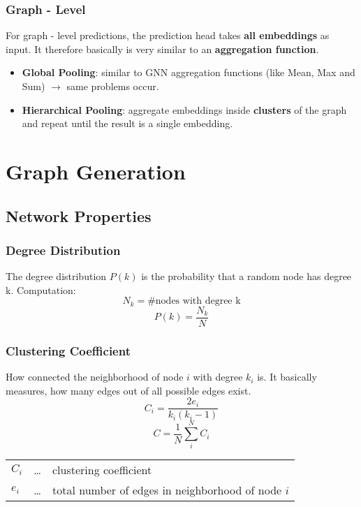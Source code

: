 \documentclass[parskip=full]{scrartcl}
\begin{document}
\subsubsection{Graph - Level}
For graph - level predictions, the prediction head takes \textbf{all embeddings} as input. It therefore basically is very similar to an \textbf{aggregation function}. \newline
\begin{itemize}
	\item \textbf{Global Pooling}: similar to GNN aggregation functions (like Mean, Max and Sum) $\rightarrow$ same problems occur.
	\item \textbf{Hierarchical Pooling}: aggregate embeddings inside \textbf{clusters} of the graph and repeat until the result is a single embedding.
\end{itemize}

\section{Graph Generation}

\subsection{Network Properties}

\subsubsection{Degree Distribution}
The degree distribution \textbf{$P(k)$} is the probability that a random node has degree k.\newline
Computation:
\[N_k = \text{\#nodes with degree k}\]
\[P(k) = \frac{N_k}{N}\]

\subsubsection{Clustering Coefficient}
How connected the neighborhood of node $i$ with degree $k_i$ is. It basically measures, how many edges out of all possible edges exist.
\[C_i = \frac{2e_i}{k_i\left(k_i-1\right)}\]
\[C = \frac{1}{N} \sum_{i}^{N} C_i\]
\begin{center}
\begin{tabular}{l c l}
	$C_i$ & \dots & clustering coefficient \\
	$e_i$ & \dots & total number of edges in neighborhood of node $i$
\end{tabular}
\end{center}
\end{document}
